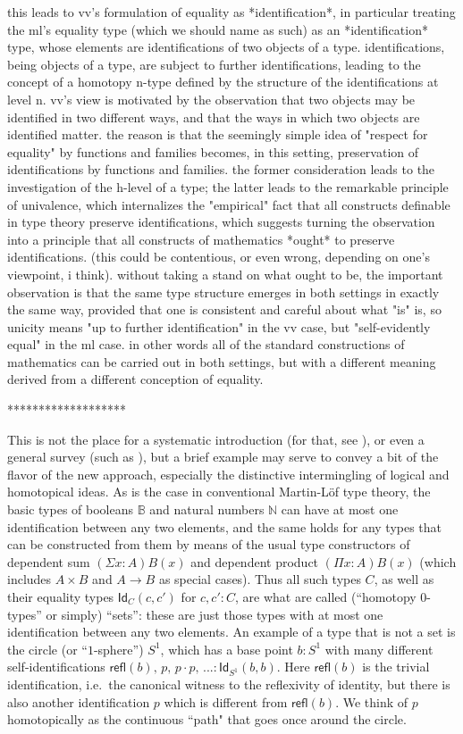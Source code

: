 \documentclass[11pt]{article}
\newcommand{\B}{\ensuremath{\mathbb{B}}}
\newcommand{\N}{\ensuremath{\mathbb{N}}}
\newcommand{\Id}{\mathsf{Id}}
\newcommand{\id}[1]{\Id_{#1}}
\newcommand{\refl}{\mathsf{refl}}
\theoremstyle{remark}
\theoremstyle{definition}
\begin{document}
this leads to vv's formulation of equality as *identification*, in particular treating the ml's equality type (which we should name as such) as an *identification* type, whose elements are identifications of two objects of a type.  identifications, being objects of a type, are subject to further identifications, leading to the concept of a homotopy n-type defined by the structure of the identifications at level n.  vv's view is motivated by the observation that two objects may be identified in two different ways, and that the ways in which two objects are identified matter.  the reason is that the seemingly simple idea of "respect for equality" by functions and families becomes, in this setting, preservation of identifications by functions and families.  the former consideration leads to the investigation of the h-level of a type; the latter leads to the remarkable principle of univalence, which internalizes the "empirical" fact that all constructs definable in type theory preserve identifications, which suggests turning the observation into a principle that all constructs of mathematics *ought* to preserve identifications.  (this could be contentious, or even wrong, depending on one's viewpoint, i think).  without taking a stand on what ought to be, the important observation is that the same type structure emerges in both settings in exactly the same way, provided that one is consistent and careful about what "is" is, so unicity means "up to further identification" in the vv case, but "self-evidently equal" in the ml case.  in other words all of the standard constructions of mathematics can be carried out in both settings, but with a different meaning derived from a different conception of equality.

*******************

This is not the place for a systematic introduction (for that, see \cite{HoTTbook}), or even a general survey (such as \cite{apw,pw}), but a brief example may serve to convey a bit of the flavor of the new approach, especially the distinctive intermingling of logical and homotopical ideas.  As is the case in conventional Martin-L\"of type theory, the basic types of booleans $\B$ and natural numbers $\N$ can have at most one identification between any two elements, and the same holds for any types that can be constructed from them by means of the usual type constructors of dependent sum $(\Sigma{x:A})B(x)$ and dependent product $(\Pi{x:A})B(x)$ (which includes $A\times B$ and $A\to B$ as special cases).  Thus all such types $C$, as well as their equality types $\id{C}(c,c')$ for $c,c':C$, are what are called (``homotopy 0-types'' or simply) ``sets'': these are just those types with at most one identification between any two elements.  An example of a type that is not a set is the circle (or ``$1$-sphere'') $S^1$, which has a base point $b: S^1$ with many different self-identifications $\refl(b),\, p,\, p\cdot p,\, ... :\id{S^1}(b,b)$.  Here $\refl(b)$ is the trivial identification, i.e.\ the canonical witness to the reflexivity of identity, but there is also another identification $p$ which is different from $\refl(b)$.  We think of $p$ homotopically as the continuous ``path" that goes once around the circle. 
\end{document}

